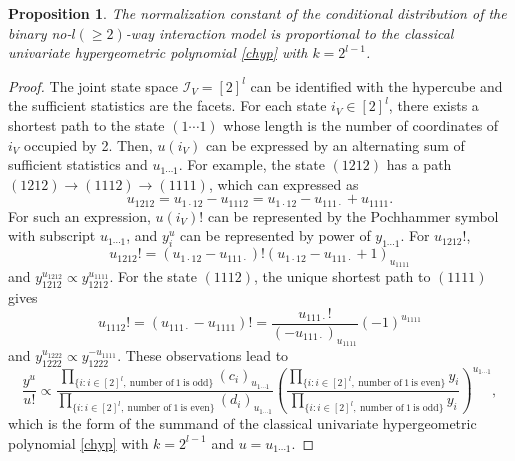 \documentclass[a4paper,12pt]{article}
\theoremstyle{plain}
\newtheorem{proposition}[theorem]{Proposition}
\theoremstyle{remark}
\begin{document}
\begin{proposition}\label{prop:no-l-way}
  The normalization constant of the conditional distribution
  of the binary no-$l(\ge 2)$-way interaction model is
  proportional to the classical univariate hypergeometric
  polynomial \eqref{chyp} with $k=2^{l-1}$.
\end{proposition}  

\begin{proof}
  The joint state space $\mathcal{I}_V=[2]^l$ can be identified
  with the hypercube and the sufficient statistics are the facets.
  For each state $i_V\in[2]^l$, there exists a shortest path to
  the state $(1\cdots 1)$ whose length is the number of coordinates
  of $i_V$ occupied by 2. Then, $u(i_V)$ can be expressed by
  an alternating sum of sufficient statistics and $u_{1\cdots 1}$.
  For example, the state $(1212)$ has a path
  $(1212)\to(1112)\to(1111)$, which can expressed as
  \[
    u_{1212}=u_{1\cdot12}-u_{1112}=u_{1\cdot12}-u_{111\cdot}
    +u_{1111}.
  \]
  For such an expression, $u(i_V)!$ can be represented by
  the Pochhammer symbol with subscript $u_{1\cdots 1}$, and
  $y_{i}^{u}$ can be represented by power of $y_{1\cdots1}$.
  For $u_{1212}!$,
  \[
    u_{1212}!
    =(u_{1\cdot12}-u_{111\cdot})!
    (u_{1\cdot12}-u_{111\cdot}+1)_{u_{1111}}
  \]
  and $y_{1212}^{u_{1212}}\propto y_{1212}^{u_{1111}}$.
  For the state $(1112)$, the unique shortest path to $(1111)$ gives
  \[
    u_{1112}!=(u_{111\cdot}-u_{1111})!=\frac{u_{111\cdot}!}
    {(-u_{111\cdot})_{u_{1111}}}(-1)^{u_{1111}}
  \]
  and $y_{1222}^{u_{1222}}\propto y_{1222}^{-u_{1111}}$.
  These observations lead to 
  \begin{equation}
    \frac{y^u}{u!}\propto
    \frac{\prod_{\{i:i\in[2]^l,~\text{number~of}~1~\text{is~odd}\}}
    (c_i)_{u_{1\cdots1}}}
    {\prod_{\{i:i\in[2]^l,~\text{number~of}~1~\text{is~even}\}}
    (d_i)_{u_{1\cdots1}}}
    \left(
    \frac{
    \prod_{\{i:i\in[2]^l,~\text{number~of}~1~\text{is~even}\}}y_i}
    {\prod_{\{i:i\in[2]^l,~\text{number~of}~1~\text{is~odd}\}}y_i}
    \right)^{u_{1\cdots1}},
    \label{toric2n}     
  \end{equation}
  which is the form of the summand of the classical univariate
  hypergeometric polynomial \eqref{chyp} with $k=2^{l-1}$ and
  $u=u_{1\cdots1}$. 
\end{proof}
\end{document}
